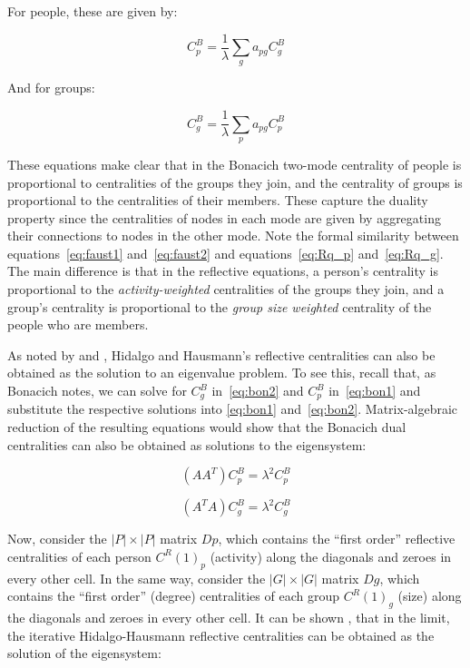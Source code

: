 \documentclass[a4paper,fleqn]{cas-sc}
\begin{document}
For people, these are given by: 

\begin{equation}
    C^B_p = \frac{1}{\lambda}\sum_{g}a_{pg}C^B_g
    \label{eq:faust1}
\end{equation}

And for groups:

\begin{equation}
    C^B_g = \frac{1}{\lambda}\sum_{p}a_{pg}C^B_p
    \label{eq:faust2}
\end{equation}

These equations make clear that in the Bonacich two-mode centrality of people is proportional to centralities of the groups they join, and the centrality of groups is proportional to the centralities of their members. These capture the duality property since the centralities of nodes in each mode are given by aggregating their connections to nodes in the other mode. Note the formal similarity between equations~\ref{eq:faust1} and~\ref{eq:faust2} and equations~\ref{eq:Rq_p} and~\ref{eq:Rq_g}. The main difference is that in the reflective equations, a person's centrality is proportional to the \textit{activity-weighted} centralities of the groups they join, and a group's centrality is proportional to the \textit{group size weighted} centrality of the people who are members.

As noted by \citet{mealy2019interpreting} and \citet{van2021correspondence}, Hidalgo and Hausmann's \citeyearpar{hidalgo2009building} reflective centralities can also be obtained as the solution to an eigenvalue problem. To see this, recall that, as Bonacich \citeyearpar[157]{bonacich1991simultaneous} notes, we can solve for $C^B_g$ in~\ref{eq:bon2} and $C^B_p$ in~\ref{eq:bon1} and substitute the respective solutions into \ref{eq:bon1} and~\ref{eq:bon2}. Matrix-algebraic reduction of the resulting equations would show that the Bonacich dual centralities can also be obtained as solutions to the eigensystem:

\begin{equation}
    \left(AA^T\right)C^B_p = \lambda^2 C^B_p
    \label{eq:bon3}
\end{equation}

\begin{equation}
    \left(A^TA\right)C^B_g = \lambda^2 C^B_g
    \label{eq:bon4}
\end{equation}

Now, consider the $|P| \times |P|$ matrix $Dp$, which contains the ``first order'' reflective centralities of each person $C^R(1)_p$ (activity) along the diagonals and zeroes in every other cell. In the same way, consider the $|G| \times |G|$ matrix $Dg$, which contains the ``first order'' (degree) centralities of each group $C^R(1)_g$ (size) along the diagonals and zeroes in every other cell. It can be shown \citep{van2021correspondence}, that in the limit, the iterative Hidalgo-Hausmann \citeyearpar{hidalgo2009building} reflective centralities can be obtained as the solution of the eigensystem:
\end{document}
